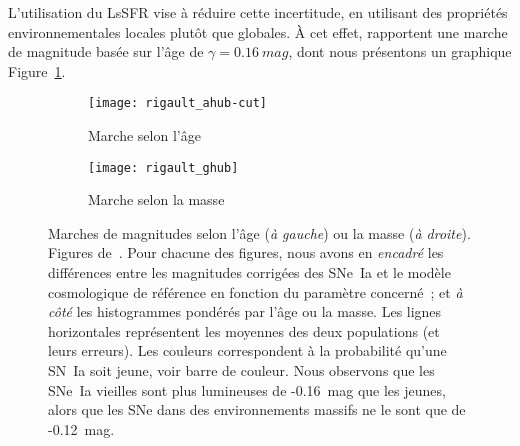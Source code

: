 \documentclass[../main/main.tex]{subfiles}
\begin{document}
L'utilisation du LsSFR vise à réduire cette incertitude, en utilisant des
propriétés environnementales locales plutôt que globales. À cet effet,
\cite{rigault2020} rapportent une marche de magnitude basée sur l'âge de $\gamma
= \SI{0.16}{mag}$, dont nous présentons un graphique Figure~\ref{fig:rigahub}.


\begin{figure}[ht]
    \centering
    \begin{subfigure}[c]{.48\linewidth}
        \centering
        \texttt{[image: rigault\_ahub-cut]}
        \caption[Marche de magnitude basée sur l'âge]{Marche selon l'âge}
    \label{fig:rigahub}
    \end{subfigure}
    \begin{subfigure}[c]{.48\linewidth}
        \centering
        \texttt{[image: rigault\_ghub]}
        \caption[Marche de magnitude basée sur la masse]{Marche selon la masse}
    \label{fig:rigghub}
    \end{subfigure}
    \caption[Marches de magnitudes selon l'âge et la masse]{Marches de
        magnitudes selon l'âge (\textit{à gauche}) ou la masse (\textit{à
        droite}). Figures de~\cite{rigault2020}. Pour chacune des figures, nous
        avons en \textit{encadré} les différences entre les magnitudes corrigées
        des SNe~Ia et le modèle cosmologique de référence en fonction du
        paramètre concerné~; et \textit{à côté} les histogrammes pondérés par
        l'âge ou la masse. Les lignes horizontales représentent les moyennes des
        deux populations (et leurs erreurs). Les couleurs correspondent à la
        probabilité qu'une SN~Ia soit jeune, voir barre de couleur. Nous
        observons que les SNe~Ia vieilles sont plus lumineuses de
        -\SI{0.16}{mag} que les jeunes, alors que les SNe dans des
    environnements massifs ne le sont que de -\SI{0.12}{mag}.}
    \label{fig:rig}
\end{figure}
\end{document}
